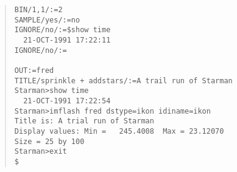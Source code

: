 \begin{quote}
\begin{tabbing}
\verb#BIN/1,1/:=2                                                                # \\
\verb#SAMPLE/yes/:=no                                                            # \\
\verb#IGNORE/no/:=$show time                                                     # \\
\verb#  21-OCT-1991 17:22:11                                                     #\\
\verb#IGNORE/no/:=                                                               # \\
\verb#                                                                           # \\
\verb#OUT:=fred                                                                  # \\
\verb#TITLE/sprinkle + addstars/:=A trail run of Starman                         # \\
\verb#Starman>show time                                                          # \\
\verb#  21-OCT-1991 17:22:54                                                     #\\
\verb#Starman>imflash fred dstype=ikon idiname=ikon                              # \\
\verb#Title is: A trial run of Starman                                           # \\
\verb#Display values: Min =   245.4008  Max = 23.12070                           #\\
\verb#Size = 25 by 100                                                           #\\
\verb#Starman>exit                                                               # \\
\verb#$                                                                          #\\
\end{tabbing}
\end{quote}

\newpage

